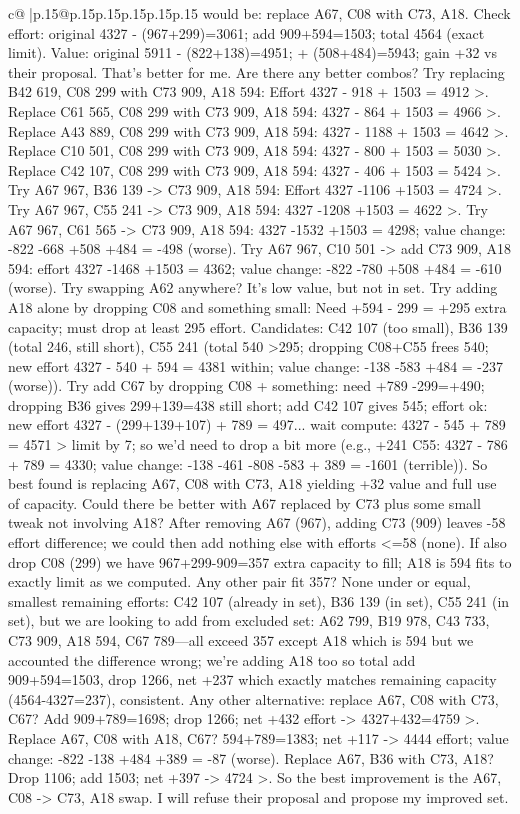 \documentclass{article}
\begin{document}
{\begin{supertabular}{c@{$\;$}|p{.15\linewidth}@{}p{.15\linewidth}p{.15\linewidth}p{.15\linewidth}p{.15\linewidth}p{.15\linewidth}}
{{{would be: replace {A67, C08} with {C73, A18}. Check effort: original 4327 - (967+299)=3061; add 909+594=1503; total 4564 (exact limit). Value: original 5911 - (822+138)=4951; + (508+484)=5943; gain +32 vs their proposal. That’s better for me. Are there any better combos? Try replacing {B42 619, C08 299} with {C73 909, A18 594}: Effort 4327 - 918 + 1503 = 4912 >. Replace {C61 565, C08 299} with {C73 909, A18 594}: 4327 - 864 + 1503 = 4966 >. Replace {A43 889, C08 299} with {C73 909, A18 594}: 4327 - 1188 + 1503 = 4642 >. Replace {C10 501, C08 299} with {C73 909, A18 594}: 4327 - 800 + 1503 = 5030 >. Replace {C42 107, C08 299} with {C73 909, A18 594}: 4327 - 406 + 1503 = 5424 >. Try {A67 967, B36 139} -> {C73 909, A18 594}: Effort 4327 -1106 +1503 = 4724 >. Try {A67 967, C55 241} -> {C73 909, A18 594}: 4327 -1208 +1503 = 4622 >. Try {A67 967, C61 565} -> {C73 909, A18 594}: 4327 -1532 +1503 = 4298; value change: -822 -668 +508 +484 = -498 (worse). Try {A67 967, C10 501} -> add {C73 909, A18 594}: effort 4327 -1468 +1503 = 4362; value change: -822 -780 +508 +484 = -610 (worse). Try swapping A62 anywhere? It's low value, but not in set. Try adding A18 alone by dropping C08 and something small: Need +594 - 299 = +295 extra capacity; must drop at least 295 effort. Candidates: C42 107 (too small), B36 139 (total 246, still short), C55 241 (total 540 >295; dropping C08+C55 frees 540; new effort 4327 - 540 + 594 = 4381 within; value change: -138 -583 +484 = -237 (worse)). Try add C67 by dropping C08 + something: need +789 -299=+490; dropping B36 gives 299+139=438 still short; add C42 107 gives 545; effort ok: new effort 4327 - (299+139+107) + 789 = 497... wait compute: 4327 - 545 + 789 = 4571 > limit by 7; so we’d need to drop a bit more (e.g., +241 C55: 4327 - 786 + 789 = 4330; value change: -138 -461 -808 -583 + 389 = -1601 (terrible)). So best found is replacing {A67, C08} with {C73, A18} yielding +32 value and full use of capacity. Could there be better with {A67} replaced by {C73} plus some small tweak not involving A18? After removing A67 (967), adding C73 (909) leaves -58 effort difference; we could then add nothing else with efforts <=58 (none). If also drop C08 (299) we have 967+299-909=357 extra capacity to fill; A18 is 594 fits to exactly limit as we computed. Any other pair fit 357? None under or equal, smallest remaining efforts: C42 107 (already in set), B36 139 (in set), C55 241 (in set), but we are looking to add from excluded set: A62 799, B19 978, C43 733, C73 909, A18 594, C67 789—all exceed 357 except A18 which is 594 but we accounted the difference wrong; we’re adding A18 too so total add 909+594=1503, drop 1266, net +237 which exactly matches remaining capacity (4564-4327=237), consistent. Any other alternative: replace {A67, C08} with {C73, C67}? Add 909+789=1698; drop 1266; net +432 effort -> 4327+432=4759 >. Replace {A67, C08} with {A18, C67}? 594+789=1383; net +117 -> 4444 effort; value change: -822 -138 +484 +389 = -87 (worse). Replace {A67, B36} with {C73, A18}? Drop 1106; add 1503; net +397 -> 4724 >. So the best improvement is the {A67, C08} -> {C73, A18} swap. I will refuse their proposal and propose my improved set. }}}
\end{supertabular}}
\end{document}
